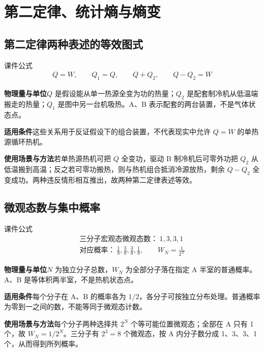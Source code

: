 \documentclass[UTF8,fontset=none,zihao=-4,a4paper]{ctexart}
\newcommand{\chapterpage}[1]{\clearpage\section{#1}}
\newcommand{\explain}[3]{\par\noindent\textbf{物理量与单位}\quad #1\par
\noindent\textbf{适用条件}\quad #2\par
\noindent\textbf{使用场景与方法}\quad #3\par}
\begin{document}
\chapterpage{第二定律、统计熵与熵变}
\par\noindent\begin{minipage}{\linewidth}
\subsection{第二定律两种表述的等效图式}
\begin{infobox}[breakable=false]{课件公式}
\begin{gather*}Q=W,\qquad Q_1=Q,\qquad Q+Q_2,\qquad Q-Q_2=W\end{gather*}
\end{infobox}
\end{minipage}\par
\explain{$Q$ 是假设能从单一热源全变为功的热量；$Q_2$ 是配套制冷机从低温端搬走的热量；$Q_1$ 是图中另一台机吸热。A、B 表示配套的两台装置，不是气体状态点。}{这些关系用于反证假设下的组合装置，不代表现实中允许 $Q=W$ 的单热源循环热机。}{若单热源热机可把 $Q$ 全变功，驱动 B 制冷机后可零外功把 $Q_2$ 从低温搬到高温；反之若可零功搬热，则与热机组合抵消冷源放热，剩余 $Q-Q_2$ 全变成功。两种违反情形相互推出，故两种第二定律表述等效。}



\par\noindent\begin{minipage}{\linewidth}
\subsection{微观态数与集中概率}
\begin{infobox}[breakable=false]{课件公式}
\begin{gather*}\text{三分子宏观态微观态数：}\ 1,3,3,1\\\text{对应概率：}\ \frac18,\frac38,\frac38,\frac18,\qquad W_N=\frac1{2^N}\end{gather*}
\end{infobox}
\end{minipage}\par
\explain{$N$ 为独立分子总数，$W_N$ 为全部分子落在指定 A 半室的普通概率。A、B 是等体积两半室，不是热机状态点。}{每个分子在 A、B 的概率各为 $1/2$，各分子可按独立分布处理。普通概率为零到一之间的数，不能等同于微观态计数。}{每个分子两种选择共 $2^N$ 个等可能位置微观态；全部在 A 只有 1 个，故 $W_N=1/2^N$。三分子有 $2^3=8$ 个微观态，按 A 内分子数分成 1、3、3、1 个，从而得到所列概率。}
\end{document}
